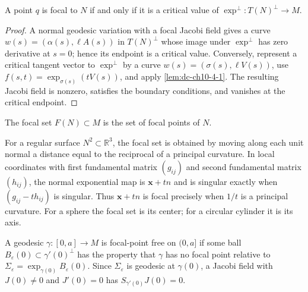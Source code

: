 \begin{proposition}
  \label{prop:dc-ch10-4-4}
  A point $q$ is focal to $N$ if and only if it is a critical value of
  $\exp^\perp:T(N)^\perp\to M$.
\end{proposition}
\begin{proof}
  \sketch
  A normal geodesic variation with a focal Jacobi field gives a curve
  $w(s)=(\alpha(s),\ell A(s))$ in $T(N)^\perp$ whose image under $\exp^\perp$ has
  zero derivative at $s=0$; hence its endpoint is a critical value. Conversely,
  represent a critical tangent vector to $\exp^\perp$ by a curve
  $w(s)=(\sigma(s),\ell V(s))$, use
  $f(s,t)=\exp_{\sigma(s)}(tV(s))$, and apply
  \cref{lem:dc-ch10-4-1}. The resulting Jacobi field is nonzero, satisfies the
  boundary conditions, and vanishes at the critical endpoint.
\end{proof}

\begin{definition}
  \label{def:dc-ch10-4-5}
  The focal set $F(N)\subset M$ is the set of focal points of $N$.
\end{definition}

\begin{example}
  \label{ex:dc-ch10-4-6}
  For a regular surface $N^2\subset\mathbb R^3$, the focal set is obtained by
  moving along each unit normal a distance equal to the reciprocal of a principal
  curvature. In local coordinates with first fundamental matrix $(g_{ij})$ and
  second fundamental matrix $(h_{ij})$, the normal exponential map is
  $\mathbf x+tn$ and is singular exactly when $(g_{ij}-th_{ij})$ is singular. Thus
  \sketch
  $\mathbf x+tn$ is focal precisely when $1/t$ is a principal curvature. For a
  sphere the focal set is its center; for a circular cylinder it is its axis.
\end{example}

\begin{definition}
  \label{def:dc-ch10-4-7}
  A geodesic $\gamma:[0,a]\to M$ is focal-point free on $(0,a]$ if some ball
  $B_\varepsilon(0)\subset\gamma'(0)^\perp$ has the property that $\gamma$ has no
  focal point relative to $\Sigma_\varepsilon=\exp_{\gamma(0)}B_\varepsilon(0)$.
  Since $\Sigma_\varepsilon$ is geodesic at $\gamma(0)$, a Jacobi field with
  $J(0)\ne0$ and $J'(0)=0$ has $S_{\gamma'(0)}J(0)=0$.
\end{definition}

